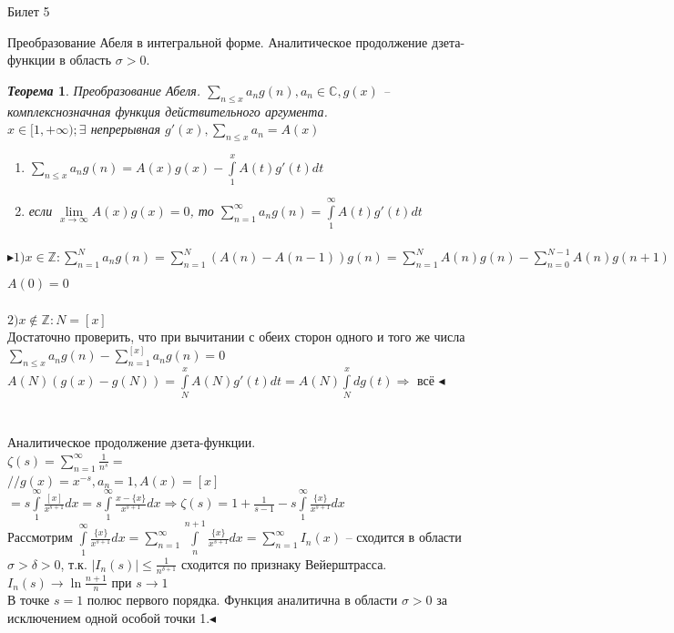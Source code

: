 \documentclass[a4paper,12pt]{article}
\newtheorem{teo}{\textit{Теорема}}
\newcommand{\q}{\quad}
\newcommand{\pb}{\blacktriangleright}
\newcommand{\pe}{\blacktriangleleft}
\newcommand{\Ra}{\Rightarrow}
\newcommand{\bb}[1]{\mathbb{#1}}
\newcommand{\SL}{\sum\limits}
\newcommand{\IL}{\int\limits}
\begin{document}
\newpage
\begin{mybox}{\hypertarget{bil5}{Билет 5}}

\begin{formbox}{}
Преобразование Абеля в интегральной форме. Аналитическое продолжение дзета-функции в область $\sigma > 0$.
\end{formbox}
\begin{formbox}{}
\begin{teo}
Преобразование Абеля. $\SL_{n\le x} a_n g(n), a_n\in \bb{C}, g(x)$ -- комплекснозначная функция действительного аргумента.\\
$x\in[1,+\infty); \exists$ непрерывная $g'(x), \SL_{n \le x}a_n = A(x)$\\
\begin{enumerate}
    \item $\SL_{n\le x}a_ng(n) = A(x)g(x) - \IL_1^x A(t)g'(t)dt $
    \item если $\lim\limits_{x\to\infty} A(x)g(x) = 0$, то $\SL_{n=1}^\infty a_ng(n) = \IL_1^\infty A(t)g'(t)dt $
\end{enumerate}
\end{teo}
\end{formbox}
$\pb 1) x\in \bb{Z}: \SL_{n=1}^Na_ng(n) = \SL_{n=1}^N(A(n) - A(n-1))g(n) = \SL_{n=1}^N A(n)g(n) - \SL_{n=0}^{N-1} A(n)g(n+1) = A(N)g(N) - \SL_{n=1}^{N-1} (g(n+1) - g(n))A(n) = A(N)g(N) - \IL_1^N A(t)g'(t)dt  $\\$A(0) = 0$\\\q\\
$2) x\not\in \bb{Z} : N = [x]  $\\
Достаточно проверить, что при вычитании с обеих сторон одного и того же числа\\
$\SL_{n\le x}a_ng(n) - \SL_{n=1}^{[x]}a_ng(n)=0 $\\
$A(N) (g(x) - g(N)) = \IL_N^x A(N)g'(t) dt = A(N)\IL_N^x dg(t)\Ra   $ всё $\pe$\\\q\\\q\\
Аналитическое продолжение дзета-функции.\\
$\zeta(s) = \SL_{n=1}^\infty \frac{1}{n^s} =$\\
$//g(x) = x^{-s}, a_n = 1, A(x) = [x]$\\
$ = s\IL_1^\infty \frac{[x]}{x^{s+1}}dx = s\IL_1^\infty \frac{x-\{x\}}{x^{s+1}}dx \Ra \zeta(s) = 1 + \frac{1}{s-1} - s\IL_1^\infty \frac{\{x\}}{x^{s+1}}dx$\\
Рассмотрим $\IL_1^\infty \frac{\{x\}}{x^{s+1}}dx = \SL_{n=1}^\infty \IL_n^{n+1} \frac{\{x\}}{x^{s+1}}dx = \SL_{n=1}^\infty I_n(x) $ -- сходится в области $\sigma > \delta > 0$, т.к. $|I_n(s)| \le \frac{1}{n^{\delta+1}}$ сходится по признаку Вейерштрасса.\\
$I_n(s)\to \ln\frac{n+1}{n} $ при $s\to 1$\\
В точке $s=1$ полюс первого порядка. Функция аналитична в области $\sigma > 0$ за исключением одной особой точки 1.$\pe$
\end{mybox}
\end{document}
